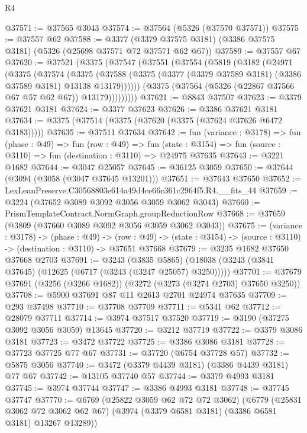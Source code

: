 \begin{lexlean}{R4}
\begin{coremodule}
@37571 := @37565 @3043
@37574 := @37564 (@5326 (@37570 @37571))
@37575 := @37557 @62
@37588 := @3377 (@3379 @37575 @3181) (@3386 @37575 @3181) (@5326 (@25698 @37571 @72 @37571 @62 @67))
@37589 := @37557 @67
@37620 := @37521
    (@3375
      (@37547
        (@37551
          (@37554
            (@5819
              (@3182
                (@24971
                  (@3375
                    (@37574
                      (@3375
                        (@37588
                          (@3375
                            (@3377 (@3379 @37589 @3181) (@3386 @37589 @3181) @13138 @13179))))))
                  (@3375 (@37564 (@5326 (@22867 @37566 @67 @57 @62 @67)) @13179)))))))))
@37621 := @8843 @37507
@37623 := @3379 @37621 @3181
@37624 := @3377 @37623
@37626 := @3386 @37621 @3181
@37634 := @3375 (@37514 (@3375 (@37620 (@3375 (@37624 @37626 @6472 @3183)))))
@37635 := @37511 @37634
@37642 := fun (variance : @3178) =>
  fun (phase : @49) =>
  fun (row : @49) =>
  fun (state : @3154) => fun (source : @3110) => fun (destination : @3110) => @24975 @37635
@37643 := @3221 @1682
@37644 := @3047 @25057
@37645 := @36125 @3059
@37650 := @37644 (@3094 (@3058 (@3047 @37645 @13201)))
@37651 := @37643 @37650
@37652 := LexLeanPreserve.C30568803e614a49d4ce66c361c2964f5.R4.__fits_44
@37659 := @3224 (@37652 @3089 @3092 @3056 @3059 @3062 @3043)
@37660 := PrismTemplateContract.NormGraph.groupReductionRow
@37668 := @37659 (@3809 (@37660 @3089 @3092 @3056 @3059 @3062 @3043))
@37675 := (variance : @3178) ->
  (phase : @49) ->
  (row : @49) -> (state : @3154) -> (source : @3110) -> (destination : @3110) -> @37651 @37668
@37679 := @3235 @1682 @37650 @37668 @2703
@37691 := @3243
    (@3835 @5865)
    (@18038 (@3243 (@3841 @37645) (@12625 (@6717 (@3243 (@3247 @25057) @3250)))))
@37701 := @37679 @37691 (@3256 (@3266 @1682)) (@3272 (@3273 (@3274 @2703) @37650 @3250))
@37708 := @5900 @37691 @87 @11 @2613 @2701 @24974 @37635
@37709 := @293 @37498
@37710 := @37708 @37709
@37711 := @5341 @62
@37712 := @28079 @37711
@37714 := @3974 @37517 @37520
@37719 := @3190 (@37275 @3092 @3056 @3059) @13645
@37720 := @3212 @37719
@37722 := @3379 @3086 @3181
@37723 := @3472 @37722
@37725 := @3386 @3086 @3181
@37728 := @37723 @37725 @77 @67
@37731 := @37720 (@6754 @37728 @57)
@37732 := @5875 @3056
@37740 := @3472 (@3379 @4439 @3181) (@3386 @4439 @3181) @77 @67
@37742 := @13105 @37740 @57
@37744 := @3379 @4993 @3181
@37745 := @3974 @37744
@37747 := @3386 @4993 @3181
@37748 := @37745 @37747
@37770 := @6769
    (@25822 @3059 @62 @72 @72 @3062)
    (@6779
      (@25831 @3062 @72 @3062 @62 @67)
      (@3974 (@3379 @6581 @3181) (@3386 @6581 @3181) @13267 @13289))

\end{coremodule}
\end{lexlean}
